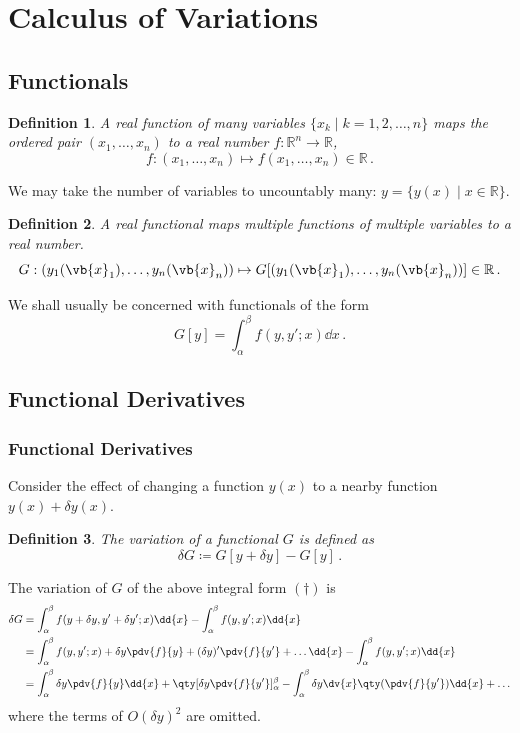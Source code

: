 \documentclass{article}
\theoremstyle{plain}\theoremheaderfont{\normalfont\itshape}\theorembodyfont{\rmfamily}\theoremseparator{.}\newtheorem*{rem}{Remark}\newtheorem*{ex}{Example}\newtheorem*{proof}{Proof}\newtheorem*{altp}{Alternative proof}
\theoremstyle{plain}\theoremheaderfont{\normalfont\bfseries}\theorembodyfont{\rmfamily}\theoremseparator{.}\newtheorem{thm}{Theorem}[section]\newtheorem{lem}[thm]{Lemma}\newtheorem{prop}[thm]{Proposition}\newtheorem*{cor}{Corollary}\newtheorem{defn}[thm]{Definition}\newtheorem{clm}[thm]{Claim}\newtheorem{clminproof}{Claim}
\theoremstyle{break}\theoremheaderfont{\normalfont\itshape}\theorembodyfont{\rmfamily}\theoremseparator{.\medskip}\newtheorem*{proofskip}{Proof}\newtheorem*{exs}{Examples}\newtheorem*{rems}{Remarks}
\theoremstyle{break}\theoremheaderfont{\normalfont\bfseries}\theorembodyfont{\rmfamily}\theoremseparator{.\medskip}\newtheorem{lemskip}[thm]{Lemma}\newtheorem{defnskip}[thm]{Definition}\newtheorem{propskip}[thm]{Proposition}\newtheorem{thmskip}[thm]{Theorem}
\numberwithin{equation}{section}
\begin{document}
	\section{Calculus of Variations}
	\subsection{Functionals}
	\begin{defn}
		A real \textit{function} of many variables \(\{x_k\mid k=1,2,\dots,n\}\) maps the ordered pair \((x_1,\dots,x_n)\) to a real number \(f:\mathbb{R}^n\to\mathbb{R}\),
		\[f:(x_1,\dots,x_n)\mapsto f(x_1,\dots,x_n)\in\mathbb{R}\,.\]
	\end{defn}
	We may take the number of variables to uncountably many: \(y=\{y(x)\mid x\in\mathbb{R}\}\).
	\begin{defn}
		A real \textit{functional} maps multiple functions of multiple variables to a real number.
		\[G:(y_1(\vb{x}_1),\dots,y_n(\vb{x}_n))\mapsto G[(y_1(\vb{x}_1),\dots,y_n(\vb{x}_n))]\in\mathbb{R}\,.\]
	\end{defn}

	We shall usually be concerned with functionals of the form
	\begin{equation}\tag{\(\dagger\)}
		G[y]=\int_{\alpha}^{\beta}f(y,y';x)\dd{x}\,.
	\end{equation}
	\subsection{Functional Derivatives}
	\subsubsection{Functional Derivatives}
	Consider the effect of changing a function \(y(x)\) to a nearby function \(y(x)+\delta y(x)\).
	\begin{defn}
		The \textit{variation} of a functional \(G\) is defined as
		\[\delta G\coloneqq G[y+\delta y]-G[y]\,.\]
	\end{defn}

	The variation of \(G\) of the above integral form \((\dagger)\) is
	\begin{align*}
		\delta G&=\int_{\alpha}^{\beta}f(y+\delta y,y'+\delta y';x)\dd{x}-\int_{\alpha}^{\beta}f(y,y';x)\dd{x}\\
		&=\int_{\alpha}^{\beta}f(y,y';x)+\delta y\pdv{f}{y}+(\delta y)'\pdv{f}{y'}+\dots\dd{x}-\int_{\alpha}^{\beta}f(y,y';x)\dd{x}\\
		&=\int_{\alpha}^{\beta}\delta y\pdv{f}{y}\dd{x}+\qty[\delta y\pdv{f}{y'}]_\alpha^\beta-\int_{\alpha}^{\beta}\delta y\dv{x}\qty(\pdv{f}{y'})\dd{x}+\dots
	\end{align*}
	where the terms of \(O(\delta y)^2\) are omitted.
\end{document}

